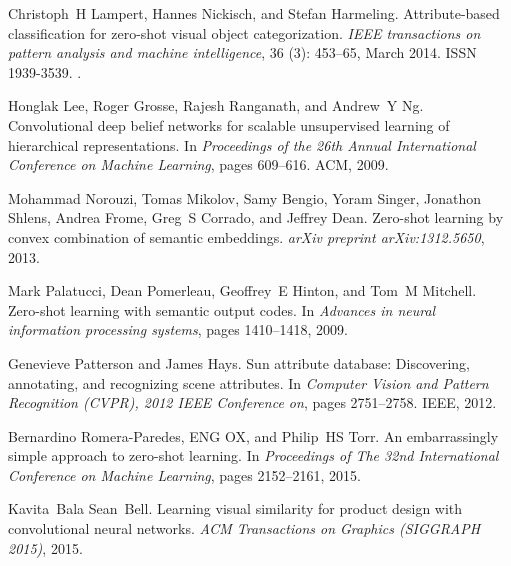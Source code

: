 \documentclass{bmvc2k}
\begin{document}
\begin{thebibliography}{23}
Christoph~H Lampert, Hannes Nickisch, and Stefan Harmeling.
\newblock Attribute-based classification for zero-shot visual object
  categorization.
\newblock \emph{IEEE transactions on pattern analysis and machine
  intelligence}, 36 (3): 453--65, March 2014.
\newblock ISSN 1939-3539.
\newblock {}.

Honglak Lee, Roger Grosse, Rajesh Ranganath, and Andrew~Y Ng.
\newblock Convolutional deep belief networks for scalable unsupervised learning
  of hierarchical representations.
\newblock In \emph{Proceedings of the 26th Annual International Conference on
  Machine Learning}, pages 609--616. ACM, 2009.

Mohammad Norouzi, Tomas Mikolov, Samy Bengio, Yoram Singer, Jonathon Shlens,
  Andrea Frome, Greg~S Corrado, and Jeffrey Dean.
\newblock Zero-shot learning by convex combination of semantic embeddings.
\newblock \emph{arXiv preprint arXiv:1312.5650}, 2013.

Mark Palatucci, Dean Pomerleau, Geoffrey~E Hinton, and Tom~M Mitchell.
\newblock Zero-shot learning with semantic output codes.
\newblock In \emph{Advances in neural information processing systems}, pages
  1410--1418, 2009.

Genevieve Patterson and James Hays.
\newblock Sun attribute database: Discovering, annotating, and recognizing
  scene attributes.
\newblock In \emph{Computer Vision and Pattern Recognition (CVPR), 2012 IEEE
  Conference on}, pages 2751--2758. IEEE, 2012.

Bernardino Romera-Paredes, ENG OX, and Philip~HS Torr.
\newblock An embarrassingly simple approach to zero-shot learning.
\newblock In \emph{Proceedings of The 32nd International Conference on Machine
  Learning}, pages 2152--2161, 2015.

Kavita~Bala Sean~Bell.
\newblock Learning visual similarity for product design with convolutional
  neural networks.
\newblock \emph{ACM Transactions on Graphics (SIGGRAPH 2015)}, 2015.


\end{thebibliography}
\end{document}
